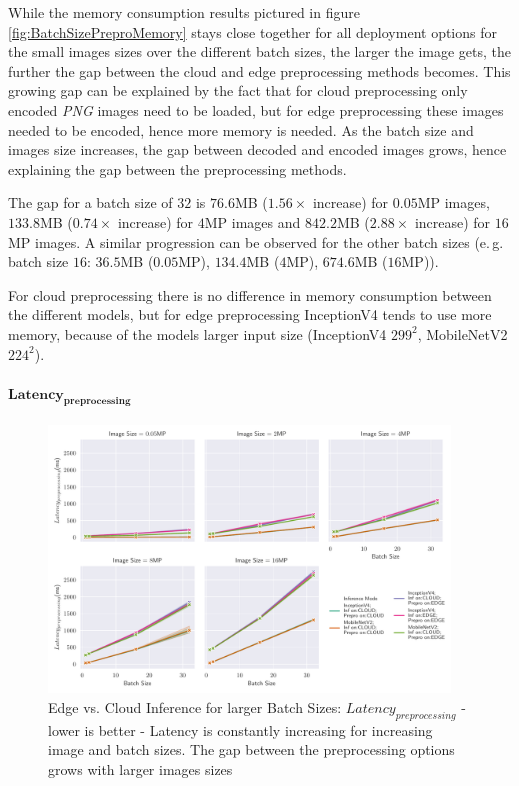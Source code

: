 While the memory consumption results pictured in figure \ref{fig:BatchSizePreproMemory} stays close together for all deployment options for the small images sizes over the different batch sizes, the larger the image gets, the further the gap between the cloud and edge preprocessing methods becomes.
This growing gap can be explained by the fact that for cloud preprocessing only encoded \emph{PNG} images need to be loaded, but for edge preprocessing these images needed to be encoded, hence more memory is needed.
As the batch size and images size increases, the gap between decoded and encoded images grows, hence explaining the gap between the preprocessing methods.

The gap for a batch size of $32$ is $76.6$MB ($1.56\times$ increase) for $0.05$MP images, $133.8$MB ($0.74\times$ increase) for $4$MP images and $842.2$MB ($2.88\times$ increase) for $16$MP images. 
A similar progression can be observed for the other batch sizes (e.\,g. batch size $16$: $36.5$MB ($0.05$MP), $134.4$MB ($4$MP), $674.6$MB ($16$MP)).

For cloud preprocessing there is no difference in memory consumption between the different models, but for edge preprocessing InceptionV4 tends to use more memory, because of the models larger input size (InceptionV4 $299^2$, MobileNetV2 $224^2$).


\paragraph{$\mathbf{Latency_{preprocessing}}$}
\begin{figure}[!htb]
\centering
\includegraphics[width=0.95\textwidth]{./Bilder/single_plots/batch_size_plots/Effects_of_Batch_size_Preprocessing_Latencies.pdf}
\caption[Edge vs. Cloud Inference for larger Batch Sizes:  $Latency_{preprocessing}$ - lower is better]{Edge vs. Cloud Inference for larger Batch Sizes:  $Latency_{preprocessing}$ - lower is better - Latency is constantly increasing for increasing image and batch sizes. The gap between the preprocessing options grows with larger images sizes}
\label{fig:BatchSizePreproLatency}
\end{figure}

